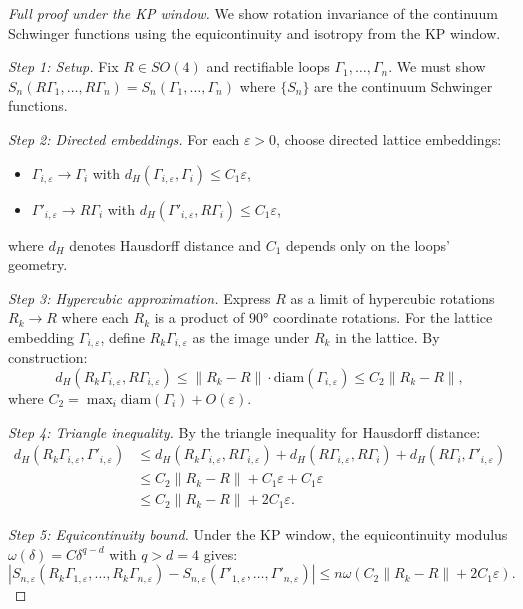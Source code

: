 \documentclass[11pt]{amsart}
\begin{document}
\begin{proof}[Full proof under the KP window]
We show rotation invariance of the continuum Schwinger functions using the equicontinuity and isotropy from the KP window.

\emph{Step 1: Setup.} Fix $R \in SO(4)$ and rectifiable loops $\Gamma_1, \ldots, \Gamma_n$. We must show $S_n(R\Gamma_1, \ldots, R\Gamma_n) = S_n(\Gamma_1, \ldots, \Gamma_n)$ where $\{S_n\}$ are the continuum Schwinger functions.

\emph{Step 2: Directed embeddings.} For each $\varepsilon > 0$, choose directed lattice embeddings:
\begin{itemize}
  \item $\Gamma_{i,\varepsilon} \to \Gamma_i$ with $d_H(\Gamma_{i,\varepsilon}, \Gamma_i) \le C_1 \varepsilon$,
  \item $\Gamma'_{i,\varepsilon} \to R\Gamma_i$ with $d_H(\Gamma'_{i,\varepsilon}, R\Gamma_i) \le C_1 \varepsilon$,
\end{itemize}
where $d_H$ denotes Hausdorff distance and $C_1$ depends only on the loops' geometry.

\emph{Step 3: Hypercubic approximation.} Express $R$ as a limit of hypercubic rotations $R_k \to R$ where each $R_k$ is a product of $90°$ coordinate rotations. For the lattice embedding $\Gamma_{i,\varepsilon}$, define $R_k \Gamma_{i,\varepsilon}$ as the image under $R_k$ in the lattice. By construction:
\[
  d_H(R_k \Gamma_{i,\varepsilon}, R \Gamma_{i,\varepsilon}) \le \|R_k - R\| \cdot \text{diam}(\Gamma_{i,\varepsilon}) \le C_2 \|R_k - R\|,
\]
where $C_2 = \max_i \text{diam}(\Gamma_i) + O(\varepsilon)$.

\emph{Step 4: Triangle inequality.} By the triangle inequality for Hausdorff distance:
\begin{align}
  d_H(R_k \Gamma_{i,\varepsilon}, \Gamma'_{i,\varepsilon}) &\le d_H(R_k \Gamma_{i,\varepsilon}, R \Gamma_{i,\varepsilon}) + d_H(R \Gamma_{i,\varepsilon}, R\Gamma_i) + d_H(R\Gamma_i, \Gamma'_{i,\varepsilon}) \\
  &\le C_2 \|R_k - R\| + C_1 \varepsilon + C_1 \varepsilon \\
  &\le C_2 \|R_k - R\| + 2C_1 \varepsilon.
\end{align}

\emph{Step 5: Equicontinuity bound.} Under the KP window, the equicontinuity modulus $\omega(\delta) = C \delta^{q-d}$ with $q > d = 4$ gives:
\[
  |S_{n,\varepsilon}(R_k \Gamma_{1,\varepsilon}, \ldots, R_k \Gamma_{n,\varepsilon}) - S_{n,\varepsilon}(\Gamma'_{1,\varepsilon}, \ldots, \Gamma'_{n,\varepsilon})| \le n \omega(C_2 \|R_k - R\| + 2C_1 \varepsilon).
\]


\end{proof}
\end{document}
